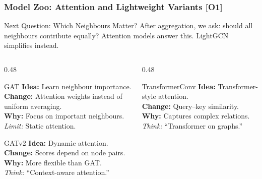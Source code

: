 \documentclass[10pt,aspectratio=43]{beamer}
\begin{document}
\begin{frame}
\frametitle{Model Zoo: Attention and Lightweight Variants \textbf{[O1]}}

\begin{block}{Next Question: Which Neighbours Matter?}
\small
After aggregation, we ask: \alert{should all neighbours contribute equally?}
Attention models answer this.
LightGCN simplifies instead.
\end{block}

\vspace{0.25em}

\begin{columns}[T]

\begin{column}{0.48\textwidth}

\begin{exampleblock}{GAT}
\small
\textbf{Idea:} Learn neighbour importance.\\
\textbf{Change:} Attention weights instead of uniform averaging.\\
\textbf{Why:} Focus on \alert{important neighbours}.\\
\textit{Limit:} Static attention.
\end{exampleblock}

\vspace{0.2em}

\begin{exampleblock}{GATv2}
\small
\textbf{Idea:} Dynamic attention.\\
\textbf{Change:} Scores depend on node pairs.\\
\textbf{Why:} \alert{More flexible than GAT}.\\
\textit{Think:} “Context-aware attention.”
\end{exampleblock}

\end{column}

\begin{column}{0.48\textwidth}

\begin{exampleblock}{TransformerConv}
\small
\textbf{Idea:} Transformer-style attention.\\
\textbf{Change:} Query–key similarity.\\
\textbf{Why:} Captures \alert{complex relations}.\\
\textit{Think:} “Transformer on graphs.”
\end{exampleblock}


\end{column}
\end{columns}
\end{frame}
\end{document}
